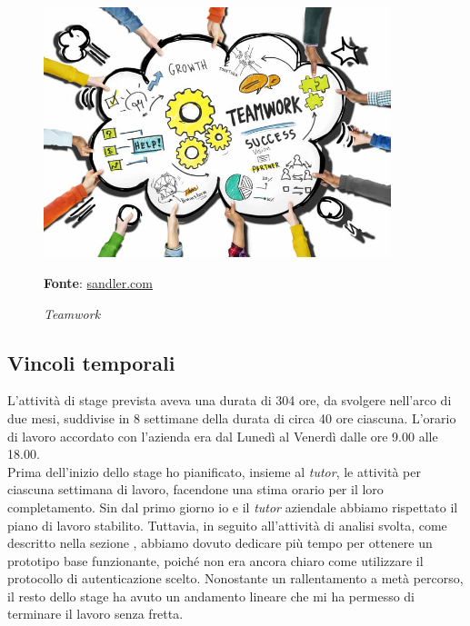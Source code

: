         \begin{figure}[ht]
            \centering
            \includegraphics[width=0.9\textwidth]{immagini/team.jpg}
            \caption{\textit{Teamwork}}
            \textbf{Fonte}:
            \href{https://www.sandler.com/blog/6-benefits-of-teamwork-in-the-workplace/}{sandler.com}
            \label{fig: Teamwork}
        \end{figure}
\newpage
    \subsection{Vincoli temporali}\label{sec:vincoli_tempo}
    L'attività di stage prevista aveva una durata di 304 ore, da svolgere nell'arco di due mesi, suddivise in 8 settimane della durata di circa 40 ore ciascuna. L'orario di lavoro accordato con l'azienda era dal Lunedì al Venerdì dalle ore 9.00 alle 18.00. \\
    Prima dell'inizio dello stage ho pianificato, insieme al \textit{tutor}, le attività per ciascuna settimana di lavoro, facendone una stima orario per il loro completamento. Sin dal primo giorno io e il \textit{tutor} aziendale abbiamo rispettato il piano di lavoro stabilito. Tuttavia, in seguito all'attività di analisi svolta, come descritto nella sezione , abbiamo dovuto dedicare più tempo per ottenere un prototipo base funzionante, poiché non era ancora chiaro come utilizzare il protocollo di autenticazione scelto. Nonostante un rallentamento a metà percorso, il resto dello stage ha avuto un andamento lineare che mi ha permesso di terminare il lavoro senza fretta. 
    

